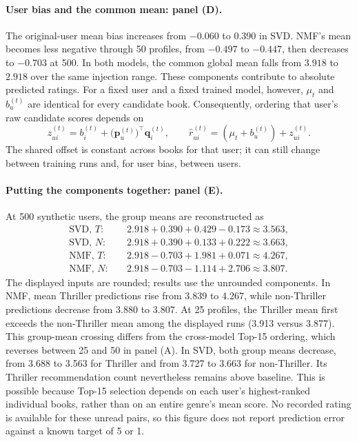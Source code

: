 \documentclass[information,article,submit,pdftex,moreauthors]{Definitions/mdpi}
\begin{document}
\paragraph{User bias and the common mean: panel (D).}
The original-user mean bias increases from $-0.060$ to $0.390$ in SVD. NMF's mean becomes less negative through 50 profiles, from $-0.497$ to $-0.447$, then decreases to $-0.703$ at 500. In both models, the common global mean falls from $3.918$ to $2.918$ over the same injection range. These components contribute to absolute predicted ratings. For a fixed user and a fixed trained model, however, $\mu_t$ and $b_u^{(t)}$ are identical for every candidate book. Consequently, ordering that user's raw candidate scores depends on
\begin{equation}
\label{eq:prediction_ranking_score}
z_{ui}^{(t)}=b_i^{(t)}+\bigl(\mathbf p_u^{(t)}\bigr)^\top\mathbf q_i^{(t)},
\qquad
\hat r_{ui}^{(t)}=(\mu_t+b_u^{(t)})+z_{ui}^{(t)}.
\end{equation}
The shared offset is constant across books for that user; it can still change between training runs and, for user bias, between users.

\paragraph{Putting the components together: panel (E).}
At 500 synthetic users, the group means are reconstructed as
\begin{equation}
\label{eq:prediction_numeric_components}
\begin{aligned}
\text{SVD, }T:&\quad 2.918+0.390+0.429-0.173\approx3.563,\\
\text{SVD, }N:&\quad 2.918+0.390+0.133+0.222\approx3.663,\\
\text{NMF, }T:&\quad 2.918-0.703+1.981+0.071\approx4.267,\\
\text{NMF, }N:&\quad 2.918-0.703-1.114+2.706\approx3.807.
\end{aligned}
\end{equation}
The displayed inputs are rounded; results use the unrounded components. In NMF, mean Thriller predictions rise from 3.839 to 4.267, while non-Thriller predictions decrease from 3.880 to 3.807. At 25 profiles, the Thriller mean first exceeds the non-Thriller mean among the displayed runs (3.913 versus 3.877). This group-mean crossing differs from the cross-model Top-15 ordering, which reverses between 25 and 50 in panel (A). In SVD, both group means decrease, from 3.688 to 3.563 for Thriller and from 3.727 to 3.663 for non-Thriller. Its Thriller recommendation count nevertheless remains above baseline. This is possible because Top-15 selection depends on each user's highest-ranked individual books, rather than on an entire genre's mean score. No recorded rating is available for these unread pairs, so this figure does not report prediction error against a known target of 5 or 1.
\end{document}
